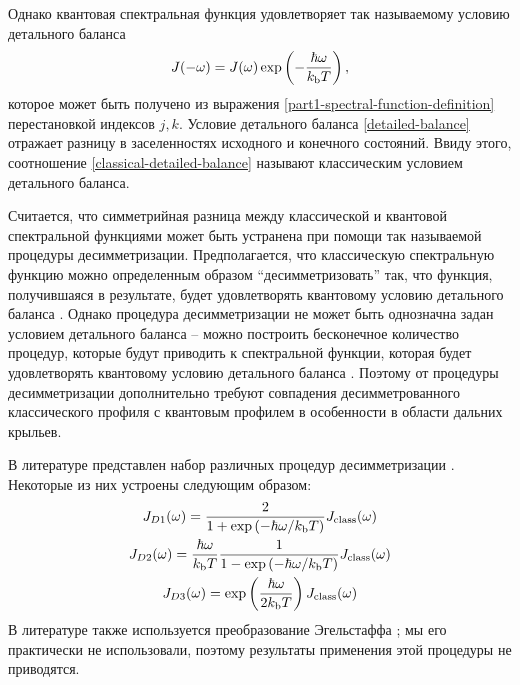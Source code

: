 Однако квантовая спектральная функция удовлетворяет так называемому условию детального баланса \cite{frommhold} 
\begin{gather}
    J(-\omega) = J(\omega) \exp \left( -\frac{\hbar \omega}{k_\text{b} T} \right), \label{detailed-balance}
\end{gather}
%
которое может быть получено из выражения \eqref{part1-spectral-function-definition} перестановкой индексов $j, k$. Условие детального баланса \eqref{detailed-balance} отражает разницу в заселенностях исходного и конечного состояний. Ввиду этого, соотношение \eqref{classical-detailed-balance} называют классическим условием детального баланса. \par
Считается, что симметрийная разница между классической и квантовой спектральной функциями может быть устранена при помощи так называемой процедуры десимметризации. Предполагается, что классическую спектральную функцию можно определенным образом \enquote{десимметризовать} так, что функция, получившаяся в результате, будет удовлетворять квантовому условию детального баланса \cite{borysow1985phenomena}. Однако процедура десимметризации не может быть однозначна задан условием детального баланса -- можно построить бесконечное количество процедур, которые будут приводить к спектральной функции, которая будет удовлетворять квантовому условию детального баланса \cite{frommhold}. Поэтому от процедуры десимметризации дополнительно требуют совпадения десимметрованного классического профиля с квантовым профилем в особенности в области дальних крыльев. \par
В литературе представлен набор различных процедур десимметризации \cite{borysow1985}. Некоторые из них устроены следующим образом:
\begin{gather}
    J_{D1}(\omega) = \frac{2}{1 + \exp \left( -\hbar \omega / k_\text{b} T \right)} J_\text{class}(\omega)  \\
    J_{D2}(\omega) = \frac{\hbar \omega}{k_\text{b} T} \frac{1}{1 - \exp \left( -\hbar \omega / k_\text{b} T \right)} J_\text{class}(\omega) \\
    J_{D3}(\omega) = \exp \left( \frac{\hbar \omega}{2 k_\text{b} T} \right) J_\text{class}(\omega)
\end{gather}
В литературе также используется преобразование Эгельстаффа \cite{egelstaff1962}; мы его практически не использовали, поэтому результаты применения этой процедуры не приводятся. 

